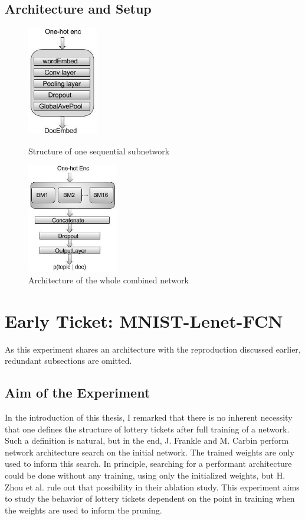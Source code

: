 \subsection*{Architecture and Setup}
\begin{figure}
	\begin{minipage}{0.5\textwidth}
		\centering
		\includegraphics[height=180px]{gfx/4-Design/base_module.png}
		\caption*{Structure of one sequential subnetwork}
		\label{?}
	\end{minipage}\hfill
	\begin{minipage}{0.5\textwidth}
		\centering
		\includegraphics[height=180px]{gfx/4-Design/combined_model.png}
		\caption*{Architecture of the whole combined network}
		\label{?}
	\end{minipage}
\end{figure}


\section{Early Ticket: MNIST-Lenet-FCN}
As this experiment shares an architecture with the reproduction discussed earlier, redundant subsections are omitted. 
\subsection*{Aim of the Experiment}
In the introduction of this thesis, I remarked that there is no inherent necessity that one defines the structure of lottery tickets after full training of a network. Such a definition is natural, but in the end, J. Frankle and M. Carbin perform network architecture search on the initial network. The trained weights are only used to inform this search.
In principle, searching for a performant architecture could be done without any training, using only the initialized weights, but H. Zhou et al. rule out that possibility in their ablation study.\cite{Deconstructing_LTH} This experiment aims to study the behavior of lottery tickets dependent on the point in training when the weights are used to inform the pruning.
